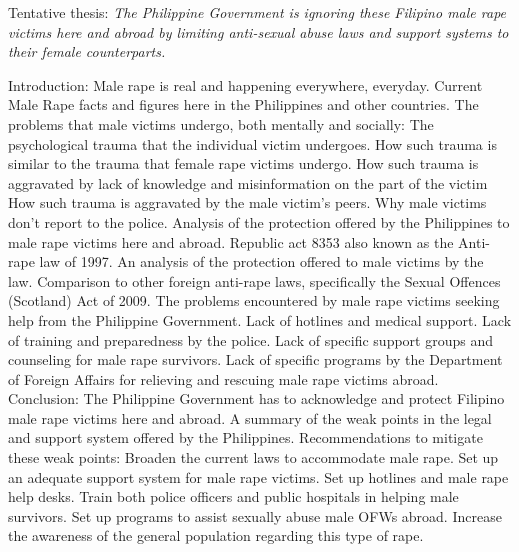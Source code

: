 Tentative thesis:\textit{ The Philippine Government is ignoring these Filipino male rape victims here and abroad by limiting anti-sexual abuse laws and support systems to their female counterparts.}



\begin{outline}[enumerate]
		\1 Introduction: Male rape is real and happening everywhere, everyday.
			\2 Current Male Rape facts and figures here in the Philippines and other countries.
			\2 The problems that male victims undergo, both mentally and socially:
				\3 The psychological trauma that the individual victim undergoes.
					\4 How such trauma is similar to the trauma that female rape victims undergo.
					\4 How such trauma is aggravated by lack of knowledge and misinformation on the part of the victim
					\4 How such trauma is aggravated by the male victim's peers.
				\3 Why male victims don't report to the police.
		\1 Analysis of the protection offered by the Philippines to male rape victims here and abroad.
			\2 Republic act 8353 also known as the Anti-rape law of 1997.
				\3 An analysis of the protection offered to male victims by the law.
				\3 Comparison to other foreign anti-rape laws, specifically the Sexual Offences (Scotland) Act of 2009.
			\2 The problems encountered by male rape victims seeking help from the Philippine Government.
				\3 Lack of hotlines and medical support.
				\3 Lack of training and preparedness by the police.
				\3 Lack of specific support groups and counseling for male rape survivors.
				\3 Lack of specific programs by the Department of Foreign Affairs for relieving and rescuing male rape victims abroad.
		\1 Conclusion: The Philippine Government has to acknowledge and protect Filipino male rape victims here and abroad.
			\2 A summary of the weak points in the legal and support system offered by the Philippines.
			\2 Recommendations to mitigate these weak points:
				\3 Broaden the current laws to accommodate male rape.
				\3 Set up an adequate support system for male rape victims.
					\4 Set up hotlines and male rape help desks.
					\4 Train both police officers and public hospitals in helping male survivors.
					\4 Set up programs to assist sexually abuse male OFWs abroad.
				\3 Increase the awareness of the general population regarding this type of rape.
\end{outline}
